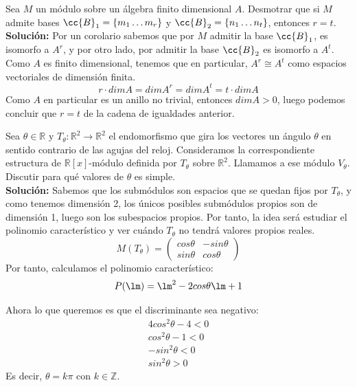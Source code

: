 \begin{ejercicio}
    Sea $M$ un módulo sobre un álgebra finito dimensional $A$. Desmotrar que si $M$ admite bases $\cc{B}_1 = \{m_1\ldots m_r\}$ y $\cc{B}_2=\{n_1 \ldots n_t\}$, entonces $r=t$. \\
    
    \noindent
    \textbf{Solución:}
    Por un corolario sabemos que por $M$ admitir la base $\cc{B}_1$, es isomorfo a $A^r$, y por otro lado, por admitir la base $\cc{B}_2$ es isomorfo a $A^t$. Como $A$ es finito dimensional, tenemos que en particular, $A^r \cong A^t$ como espacios vectoriales de dimensión finita. 
    \begin{equation*}
        r\cdot dim A = dimA^r = dimA^t = t \cdot dim A
    \end{equation*}
    Como $A$ en particular es un anillo no trivial, entonces $dim A > 0$, luego podemos concluir que $r = t$ de la cadena de igualdades anterior. 
\end{ejercicio}

\begin{ejercicio}
    Sea $\theta \in \mathbb{R}$ y $T_\theta : \mathbb{R}^2 \to \mathbb{R}^2$ el endomorfismo que gira los vectores un ángulo $\theta$ en sentido contrario de las agujas del reloj. Consideramos la correspondiente estructura de $\mathbb{R}[x]$-módulo definida por $T_\theta$ sobre $\mathbb{R}^2$. Llamamos a ese módulo $V_\theta$. Discutir para qué valores de $\theta$ es simple. \\
    
    \noindent
    \textbf{Solución:}
    Sabemos que los submódulos son espacios que se quedan fijos por $T_\theta$, y como tenemos dimensión 2, los únicos posibles submódulos propios son de dimensión 1, luego son los subespacios propios. Por tanto, la idea será estudiar el polinomio característico y ver cuándo $T_\theta$ no tendrá valores propios reales.
    \begin{equation*}
        M(T_\theta) = \left(\begin{array}{cc}
            cos\theta & -sin\theta \\
            sin\theta & cos\theta 
        \end{array}\right)
    \end{equation*}
    Por tanto, calculamos el polinomio característico:
    \begin{equation*}
        P(\lm) = \lm^2-2cos\theta\lm + 1
    \end{equation*}

    Ahora lo que queremos es que el discriminante sea negativo:
    \begin{gather*}
        4cos^2\theta - 4 < 0 \\
        cos^2\theta - 1 < 0 \\ 
        -sin^2\theta < 0 \\
        sin^2\theta > 0
    \end{gather*}
    Es decir, $\theta = k\pi$ con $k \in \mathbb{Z}$. 
\end{ejercicio}

